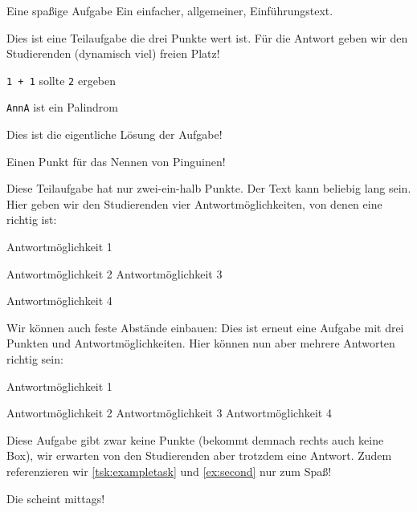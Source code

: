 \begin{task}[8.5]{Eine spaßige Aufgabe}
Ein einfacher, allgemeiner, Einführungstext.

\begin{subtasks}
    Dies ist eine Teilaufgabe die drei Punkte wert ist. Für die Antwort geben wir den Studierenden (dynamisch viel) freien Platz!
   \begin{examples}
      \item \texttt{1 + 1} sollte \texttt{2} ergeben
      \item \texttt{AnnA} ist ein Palindrom
   \end{examples}

   \VerticalSpace
\begin{solution}
   Dies ist die eigentliche Lösung der Aufgabe!
\end{solution}
\begin{correction}
   Einen Punkt für das Nennen von Pinguinen!
\end{correction}
    \label{tsk:exampletask}Diese Teilaufgabe hat nur zwei-ein-halb Punkte. Der Text kann beliebig lang sein. Hier geben wir den Studierenden vier Antwortmöglichkeiten, von denen eine richtig ist:
   \begin{radioboxes}
      \item    Antwortmöglichkeit 1
      \item    Antwortmöglichkeit 2
      \correct Antwortmöglichkeit 3
      \item    Antwortmöglichkeit 4
   \end{radioboxes}
   Wir können auch feste Abstände einbauen:
   \VerticalSpace[2cm]
    Dies ist erneut eine Aufgabe mit drei Punkten und Antwortmöglichkeiten. Hier können nun aber mehrere Antworten richtig sein:
   \begin{checkboxes}
      \correct Antwortmöglichkeit 1
      \item    Antwortmöglichkeit 2
      \correct Antwortmöglichkeit 3
      \correct Antwortmöglichkeit 4
   \end{checkboxes}
    Diese Aufgabe gibt zwar keine Punkte (bekommt demnach rechts auch keine Box), wir erwarten von den Studierenden aber trotzdem eine Antwort. Zudem referenzieren wir \autoref{tsk:exampletask} und \autoref{ex:second} nur zum Spaß!

   Die  scheint mittags!
   \qquad\strut
\end{subtasks}
\end{task}
